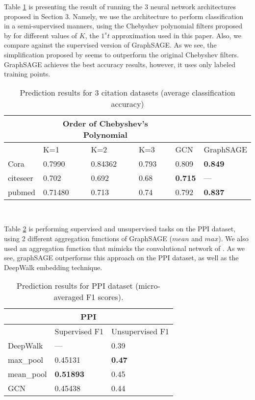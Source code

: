 Table \ref{table:2} is presenting the result of running the $3$ neural network
architectures proposed in Section  3. Namely, we use the \cite{kipf2017semi}
architecture to perform classification in a semi-supervised manners, using the
Chebyshev polynomial filters proposed by \cite{defferrard2016convolutional} for
different values of $K$, the $1^st$ approximation used in this paper. Also, we
compare against the supervised version of GraphSAGE. As we see, the
simplification proposed by \cite{kipf2017semi} seems to outperform the original
Chebyshev filters. GraphSAGE achieves the best accuracy results, however, it
uses only labeled training points.
\begin{table}[h!]
\centering
\caption{Prediction results for 3 citation datasets (average classification accuracy)}
\begin{tabular}{ |p{2cm}||p{2cm}|p{2cm}|p{2cm}|p{2cm}|p{2cm}|}
 \hline
 &\multicolumn{3}{c}{\textbf{Order of Chebyshev's Polynomial}} &&\\
 \hline
 &K=1& K=2 &K=3 &GCN & GraphSAGE\\
 \hline\hline
 Cora   & 0.7990    &0.84362 &0.793 &0.809 &\textbf{0.849}\\
 citeseer &   0.702  & 0.692 &0.68 &\textbf{0.715}& --- \\
 pubmed &0.71480 & 0.713 &0.74 &0.792 &\textbf{0.837}\\
 \hline
\end{tabular}\\
\label{table:2}
\end{table}

Table \ref{table:1} is performing supervised and unsupervised tasks on the PPI
dataset, using 2 different aggregation functions of GraphSAGE ($mean$ and
$max$). We also used an aggregation function that mimicks the convolutional
network of \cite{kipf2017semi}. As we see, graphSAGE outperforms this approach
on the PPI dataset, as well as the DeepWalk embedding technique.
\begin{table}[h!]
\centering
\caption{Prediction results for PPI dataset (micro-averaged F1 scores). \newline}
\begin{tabular}{|p{3cm}||p{3cm}|p{3cm}|}
 \hline
 \multicolumn{3}{|c|}{\textbf{PPI}} \\
 \hline
 & Supervised F1 &Unsupervised F1\\
 \hline\hline
 DeepWalk   & ---    &0.39\\
 max\_pool &   0.45131  & \textbf{0.47} \\
 mean\_pool &\textbf{0.51893} & 0.45\\
 GCN    &0.45438 & 0.44\\
 \hline
\end{tabular}\\
\label{table:1}
\end{table}

